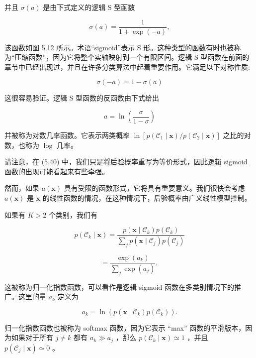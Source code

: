 \documentclass[10pt]{report}
\begin{document}
并且 \(\sigma \left( a\right)\) 是由下式定义的逻辑 S 型函数

\[
\sigma \left( a\right)  = \frac{1}{1 + \exp \left( {-a}\right) }, \tag{5.42}
\]

该函数如图 5.12 所示。术语“sigmoid”表示 S 形。这种类型的函数有时也被称为“压缩函数”，因为它将整个实轴映射到一个有限区间。逻辑 S 型函数在前面的章节中已经出现过，并且在许多分类算法中起着重要作用。它满足以下对称性质:

\[
\sigma \left( {-a}\right)  = 1 - \sigma \left( a\right)  \tag{5.43}
\]

这很容易验证。逻辑 S 型函数的反函数由下式给出

\[
a = \ln \left( \frac{\sigma }{1 - \sigma }\right)  \tag{5.44}
\]

并被称为对数几率函数。它表示两类概率 \(\ln \left\lbrack  {p\left( {{\mathcal{C}}_{1} \mid  \mathbf{x}}\right) /p\left( {{\mathcal{C}}_{2} \mid  \mathbf{x}}\right) }\right\rbrack\) 之比的对数，也称为 \(\log\) 几率。

请注意，在 (5.40) 中，我们只是将后验概率重写为等价形式，因此逻辑 sigmoid 函数的出现可能看起来有些牵强。

然而，如果 \(a\left( \mathbf{x}\right)\) 具有受限的函数形式，它将具有重要意义。我们很快会考虑 \(a\left( \mathbf{x}\right)\) 是 \(\mathbf{x}\) 的线性函数的情况，在这种情况下，后验概率由广义线性模型控制。

如果有 \(K > 2\) 个类别，我们有

\[
p\left( {{\mathcal{C}}_{k} \mid  \mathbf{x}}\right)  = \frac{p\left( {\mathbf{x} \mid  {\mathcal{C}}_{k}}\right) p\left( {\mathcal{C}}_{k}\right) }{\mathop{\sum }\limits_{j}p\left( {\mathbf{x} \mid  {\mathcal{C}}_{j}}\right) p\left( {\mathcal{C}}_{j}\right) }
\]

\[
= \frac{\exp \left( {a}_{k}\right) }{\mathop{\sum }\limits_{j}\exp \left( {a}_{j}\right) }, \tag{5.45}
\]

这被称为归一化指数函数，可以看作是逻辑 sigmoid 函数在多类别情况下的推广。这里的量 \({a}_{k}\) 定义为

\[
{a}_{k} = \ln \left( {p\left( {\mathbf{x} \mid  {\mathcal{C}}_{k}}\right) p\left( {\mathcal{C}}_{k}\right) }\right) . \tag{5.46}
\]

归一化指数函数也被称为 softmax 函数，因为它表示 “max” 函数的平滑版本，因为如果对于所有 \(j \neq  k\) 都有 \({a}_{k} \gg  {a}_{j}\) ，那么 \(p\left( {{\mathcal{C}}_{k} \mid  \mathbf{x}}\right)  \simeq  1\) ，并且 \(p\left( {{\mathcal{C}}_{j} \mid  \mathbf{x}}\right)  \simeq  0\) 。
\end{document}
